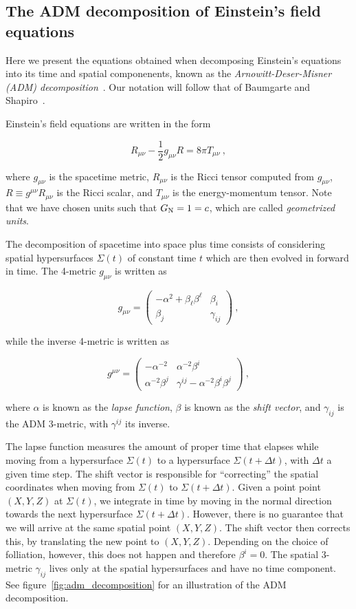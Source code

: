 \documentclass[a4paper,11pt]{article}
\renewcommand{\a}{\alpha}
\renewcommand{\b}{\beta}
\newcommand{\g}{\gamma}
\newcommand{\gDD}[2]{\g_{{#1}{#2}}}
\newcommand{\gUU}[2]{\g^{{#1}{#2}}}
\newcommand{\GDD}[2]{g_{{#1}{#2}}}
\newcommand{\GUU}[2]{g^{{#1}{#2}}}
\newcommand{\dt}{\Delta t}
\newcommand{\lrpar}[1]{\left( #1 \right)}
\newcommand{\n}{\noindent}
\newcommand{\eq}[1]{
  \begin{equation}
    #1
  \end{equation}
}
\begin{document}
\subsection{The ADM decomposition of Einstein's field equations}

Here we present the equations obtained when decomposing Einstein's equations into its time and spatial componenents, known as the \emph{Arnowitt-Deser-Misner (ADM) decomposition}~\cite{Arnowitt:1959ah}. Our notation will follow that of Baumgarte and Shapiro~\cite{Baumgarte:2010ndz}.

Einstein's field equations are written in the form

\eq{
  R_{\mu\nu} - \frac{1}{2}\GDD{\mu}{\nu}R = 8\pi T_{\mu\nu}\ ,
}

\n where $\GDD{\mu}{\nu}$ is the spacetime metric, $R_{\mu\nu}$ is the Ricci tensor computed from $\GDD{\mu}{\nu}$, $R \equiv \GUU{\mu}{\nu}R_{\mu\nu}$ is the Ricci scalar, and $T_{\mu\nu}$ is the energy-momentum tensor. Note that we have chosen units such that $G_{\rm N}=1=c$, which are called \emph{geometrized units}.

The decomposition of spacetime into space plus time consists of considering spatial hypersurfaces $\Sigma\lrpar{t}$ of constant time $t$ which are then evolved in forward in time. The 4-metric $\GDD{\mu}{\nu}$ is written as

\eq{
  \GDD{\mu}{\nu} =
  \begin{pmatrix}
    -\a^{2} + \b_{\ell}\b^{\ell} & \b_{i}\\
    \b_{j} & \gDD{i}{j}
  \end{pmatrix}\ ,
}

\n while the inverse 4-metric is written as

\eq{
  \GUU{\mu}{\nu} =
  \begin{pmatrix}
    -\a^{-2} & \a^{-2}\b^{i}\\
    \a^{-2}\b^{j} & \gUU{i}{j} - \a^{-2}\b^{i}\b^{j}
  \end{pmatrix}\ ,
}

\n where $\a$ is known as the \emph{lapse function}, $\b$ is known as the \emph{shift vector}, and $\gDD{i}{j}$ is the ADM 3-metric, with $\gUU{i}{j}$ its inverse.

The lapse function measures the amount of proper time that elapses while moving from a hypersurface $\Sigma\lrpar{t}$ to a hypersurface $\Sigma\lrpar{t+\dt}$, with $\dt$ a given time step. The shift vector is responsible for ``correcting'' the spatial coordinates when moving from $\Sigma\lrpar{t}$ to $\Sigma\lrpar{t+\dt}$. Given a point point $(X,Y,Z)$ at $\Sigma\lrpar{t}$, we integrate in time by moving in the normal direction towards the next hypersurface $\Sigma\lrpar{t+\dt}$. However, there is no guarantee that we will arrive at the same spatial point $(X,Y,Z)$. The shift vector then corrects this, by translating the new point to $(X,Y,Z)$. Depending on the choice of folliation, however, this does not happen and therefore $\b^{i}=0$. The spatial 3-metric $\gDD{i}{j}$ lives only at the spatial hypersurfaces and have no time component. See figure~\ref{fig:adm_decomposition} for an illustration of the ADM decomposition.
\end{document}
